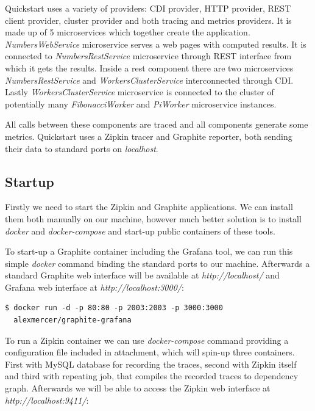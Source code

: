 \documentclass[12pt,oneside]{fithesis2}
\begin{document}
Quickstart uses a variety of providers: CDI provider, HTTP provider, REST client provider, cluster provider and both tracing and metrics providers. It is made up of 5 microservices which together create the application. \textit{NumbersWebService} microservice serves a web pages with computed results. It is connected to \textit{NumbersRestService} microservice through REST interface from which it gets the results. Inside a rest component there are two microservices \textit{NumbersRestService} and \textit{WorkersClusterService} interconnected through CDI. Lastly \textit{WorkersClusterService} microservice is connected to the cluster of potentially many \textit{FibonacciWorker} and \textit{PiWorker} microservice instances.

All calls between these components are traced and all components generate some metrics. Quickstart uses a Zipkin tracer and Graphite reporter, both sending their data to standard ports on \textit{localhost}.

\subsection{Startup}

Firstly we need to start the Zipkin and Graphite applications. We can install them both manually on our machine, however much better solution is to install \textit{docker} and \textit{docker-compose} and start-up public containers of these tools.

To start-up a Graphite container including the Grafana tool, we can run this simple \textit{docker} command binding the standard ports to our machine. Afterwards a standard Graphite web interface will be available at \textit{http://localhost/} and Grafana web interface at \textit{http://localhost:3000/}:\newline

\begin{verbatim}
$ docker run -d -p 80:80 -p 2003:2003 -p 3000:3000
  alexmercer/graphite-grafana
\end{verbatim}

To run a Zipkin container we can use \textit{docker-compose} command providing a configuration file included in attachment, which will spin-up three containers. First with MySQL database for recording the traces, second with Zipkin itself and third with repeating job, that compiles the recorded traces to dependency graph. Afterwards we will be able to access the Zipkin web interface at \textit{http://localhost:9411/}:\newline
\end{document}
